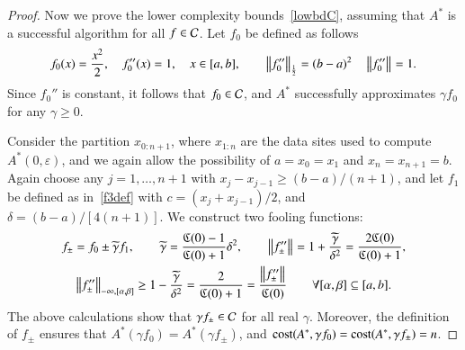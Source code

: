 \documentclass[review]{elsarticle}
\newcommand{\abstol}{\varepsilon}
\theoremstyle{definition}
\newcommand{\tgamma}{\widetilde{\gamma}}
\begin{document}
\begin{proof}
	Now we prove the lower complexity bounds~\eqref{lowbdC}, assuming that $A^*$ is
	a successful algorithm for all $f \in \mathcal{C}$. Let $f_0$ be defined as follows
	\begin{equation}
	\label{assumpfzero}
	f_0(x) =\frac{x^2}{2}, \quad f_0''(x) = 1, \quad x \in [a,b], \qquad \norm[\frac12]{f_0''}
	= (b -a)^2  \quad \norm{f_0''} = 1.
	\end{equation}
	Since $f_0''$ is constant, it follows that $f_0 \in \mathcal{C}$,  and $A^*$ successfully 
	approximates $\gamma f_0$ for any  $\gamma\ge0$.
	
	Consider the partition $x_{0:n+1}$, where $x_{1:n}$ are the data sites
	used to compute $A^*(0,\abstol)$, and we again allow the possibility of $a = x_0=x_1$
	and $x_n = x_{n+1} = b$.  Again choose any $j=1, \ldots, n+1$ with $x_j-x_{j-1}
	\ge (b-a)/(n+1)$, and let $f_1$ be defined as in~\eqref{f3def} with $c =
	(x_j+x_{j-1})/2$, and $\delta = (b-a)/[4(n+1)]$. We construct two fooling
	functions:
	\begin{gather*}
	f_{\pm} = f_0 \pm \tgamma f_1, \qquad \tgamma =\frac{\fC(0)-1}{\fC(0)+1}\delta^2,
	\qquad
	\norm{f''_{\pm}} = 1+\frac{\tgamma}{\delta^2} = \frac{2\fC(0)}{\fC(0)+1} , \\
\norm[-\infty,{[\alpha,\beta]}]{f''_{\pm}} \ge 1-\frac{\tgamma}{\delta^2} = \frac{2}{\fC(0)+1}
= \frac{\norm{f''_{\pm}} }{\fC(0)} \qquad \forall [\alpha,\beta] \subseteq [a,b].
	\end{gather*}
	The above calculations show that $\gamma f_{\pm} \in \mathcal{C}$ for all real
	$\gamma$. Moreover, the definition of $f_{\pm}$ ensures that $A^*(\gamma f_0) =
	A^*(\gamma f_{\pm})$, and $\operatorname{cost}(A^*,\gamma f_0) = \operatorname{cost}(A^*,\gamma f_{\pm}) =
	n$.
	

\end{proof}
\end{document}
